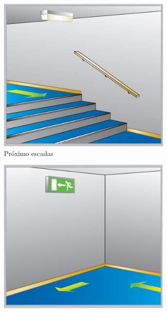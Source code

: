	\begin{figure}[H]
		\centering
		\begin{subfigure}[b]{0.3\textwidth}
			\centering
			\includegraphics[width=\textwidth]{Figures/3. Lighting/light-safety4.jpg}
			\caption{Próximo escadas}
			\label{fig: style 1 image d}
		\end{subfigure}
		\hfill
		\begin{subfigure}[b]{0.3\textwidth}
			\centering
			\includegraphics[width=\textwidth]{Figures/3. Lighting/light-safety5.jpg}

\end{subfigure}
\end{figure}
